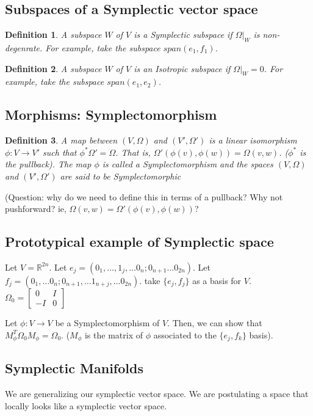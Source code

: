 \documentclass[11pt]{book}
\newcommand{\R}{\ensuremath{\mathbb R}}
\newtheorem{definition}{Definition}
\begin{document}
\subsection{Subspaces of a Symplectic vector space}

\begin{definition}
    A subspace $W$ of $V$ is a Symplectic subspace if $\Omega|_W$ is non-degenrate.
    For example, take the subspace $span(e_1, f_1)$.
\end{definition}


\begin{definition}
    A subspace $W$ of $V$ is an Isotropic subspace if $\Omega|_W = 0$.
    For example, take the subspace $span(e_1, e_2)$.
\end{definition}

\subsection{Morphisms: Symplectomorphism}
\begin{definition}
    A map between $(V, \Omega)$ and $(V', \Omega')$ is a linear isomorphism
    $\phi: V \rightarrow V'$ such that $\phi^* \Omega' = \Omega$. That is,
    $\Omega'(\phi(v), \phi(w)) = \Omega(v, w)$. ($\phi^*$ is the pullback).
    The map $\phi$ is called a Symplectomorphism and the spaces $(V, \Omega)$ and $(V', \Omega')$
    are said to be Symplectomorphic
\end{definition}

(Question: why do we need to define this in terms of a pullback? Why not
pushforward? ie, $\Omega(v, w) = \Omega'(\phi(v), \phi(w))$?

\subsection{Prototypical example of Symplectic space}
Let $V = \R^{2n}$. Let $e_j = (0_1, \dots, 1_j, \dots 0_n; 0_{n+1} \dots 0_{2n})$.
Let $f_j = (0_1, \dots 0_n; 0_{n+1}, \dots 1_{n+j}, \dots 0_{2n})$.
take $\{e_j, f_j\}$  as a basis for $V$.
$\Omega_0 = \begin{bmatrix} 0 & I \\ -I & 0 \end{bmatrix}$

Let $\phi: V \rightarrow V$ be a Symplectomorphism of $V$. Then, we can 
show that $M_\phi^T \Omega_0 M_\phi = \Omega_0$. ($M_\phi$ is the matrix of $\phi$
associated to the $\{e_j, f_k\}$ basis). 

\subsection{Symplectic Manifolds}
We are generalizing our symplectic vector space. We are postulating a space
that locally looks like a symplectic vector space.
\end{document}

